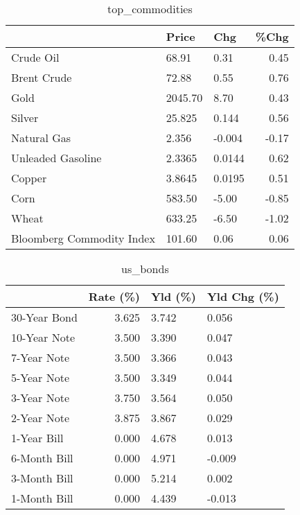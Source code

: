 \documentclass{article}%
\begin{document}
\begin{table}[htbp]%
\caption{top\_commodities}%
\centering%
\begin{adjustbox}{width=1\textwidth}%
\begin{tabular}{lllr}
\toprule
                          &   Price &    Chg &  \%Chg \\
\midrule
               Crude Oil  &   68.91 &   0.31 &  0.45 \\
             Brent Crude  &   72.88 &   0.55 &  0.76 \\
                    Gold  & 2045.70 &   8.70 &  0.43 \\
                  Silver  &  25.825 &  0.144 &  0.56 \\
             Natural Gas  &   2.356 & -0.004 & -0.17 \\
       Unleaded Gasoline  &  2.3365 & 0.0144 &  0.62 \\
                  Copper  &  3.8645 & 0.0195 &  0.51 \\
                    Corn  &  583.50 &  -5.00 & -0.85 \\
                   Wheat  &  633.25 &  -6.50 & -1.02 \\
Bloomberg Commodity Index &  101.60 &   0.06 &  0.06 \\
\bottomrule
\end{tabular}
%
\end{adjustbox}%
\end{table}

%


\begin{table}[htbp]%
\caption{us\_bonds}%
\centering%
\begin{adjustbox}{width=1\textwidth}%
\begin{tabular}{lrll}
\toprule
             &  Rate (\%) & Yld (\%) & Yld Chg (\%) \\
\midrule
30-Year Bond &     3.625 &   3.742 &       0.056 \\
10-Year Note &     3.500 &   3.390 &       0.047 \\
 7-Year Note &     3.500 &   3.366 &       0.043 \\
 5-Year Note &     3.500 &   3.349 &       0.044 \\
 3-Year Note &     3.750 &   3.564 &       0.050 \\
 2-Year Note &     3.875 &   3.867 &       0.029 \\
 1-Year Bill &     0.000 &   4.678 &       0.013 \\
6-Month Bill &     0.000 &   4.971 &      -0.009 \\
3-Month Bill &     0.000 &   5.214 &       0.002 \\
1-Month Bill &     0.000 &   4.439 &      -0.013 \\
\bottomrule
\end{tabular}
%
\end{adjustbox}%
\end{table}
\end{document}
